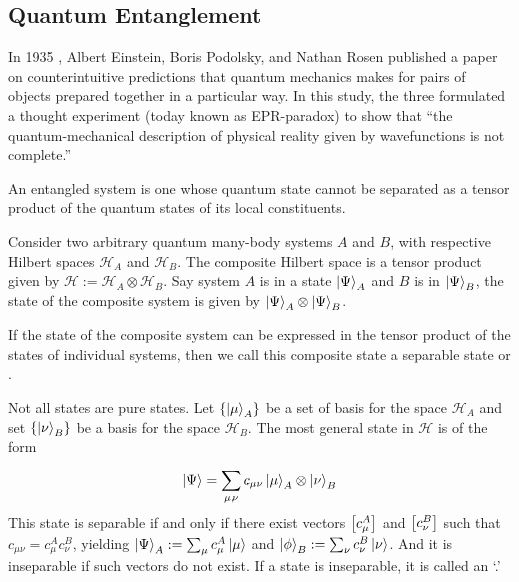 \documentclass[11pt, oneside, listof=totoc]{scrbook}
\renewcommand{\H}{\mathcal{H}}
\begin{document}
\subsection{Quantum Entanglement}

In 1935 \cite{Einstein1935}, Albert Einstein, Boris Podolsky, and Nathan Rosen published a paper on counterintuitive predictions that quantum mechanics makes for pairs of objects prepared together in a particular way. In this study, the three formulated a thought experiment (today known as EPR-paradox) to show that ``the quantum-mechanical description of physical reality given by wavefunctions is not complete.''

\begin{definition}
    An entangled system is one whose quantum state cannot be separated as a tensor product of the quantum states of its local constituents.
\end{definition}

Consider two arbitrary quantum many-body systems $A$ and $B$, with respective Hilbert spaces \(\H_{A}\) and \(\H_{B}\). The composite Hilbert space is a tensor product given by \(\H:= \H_{A} \otimes \H_{B}\). Say system \(A\) is in a state \(\ket{\Psi}_A\) and \(B\) is in \(\ket{\Psi}_B\), the state of the composite system is given by \(\ket{\Psi}_A \otimes \ket{\Psi}_B\).
\begin{remark}
    If the state of the composite system can be expressed in the tensor product of the states of individual systems, then we call this composite state a separable state or .

    \noindent Not all states are pure states. Let \(\qty{\ket{\mu}_A}\) be a set of basis for the space \(\H_A\) and set \(\qty{\ket{\nu}_B}\) be a basis for the space \(\H_B\). The most general state in \(\H\) is of the form
    \begin{equation}\label{eq:tensor_state}
        \ket{\Psi} = \sum_{\mu,\!\nu}^{} c_{\mu \nu} \ket{\mu}_A \otimes \ket{\nu}_B
    \end{equation}
    This state is separable if and only if there exist vectors \(\qty[c_{\mu}^{A}]\) and \(\qty[c_{\nu}^{B}]\) such that \(c_{\mu \nu} = c_{\mu}^{A} c_{\nu}^{B}\), yielding \(\ket{\Psi}_A:= \sum_{\mu} c_{\mu}^{A} \ket{\mu}\) and \(\ket{\phi}_B:= \sum_{\nu} c_{\nu}^{B} \ket{\nu}\). And it is inseparable if such vectors do not exist. If a state is inseparable, it is called an `.'
\end{remark}
\end{document}
